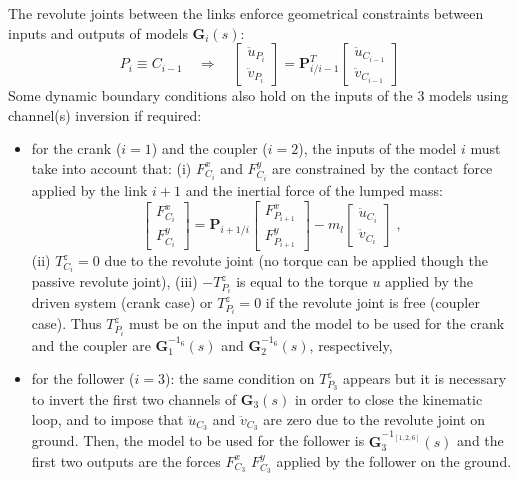 The revolute joints between the links enforce geometrical constraints between inputs and outputs of models $\mathbf{G}_i(s)$:
\[
P_{i}\equiv C_{i-1}\quad \Rightarrow \quad  \left[\begin{array}{c}\ddot{u}_{P_i} \\ \ddot{v}_{P_i}\end{array}\right]=\mathbf{P}_{i/i-1}^T\left[\begin{array}{c}\ddot{u}_{C_{i-1}} \\ \ddot{v}_{C_{i-1}}\end{array}\right]
\]
Some dynamic boundary conditions also hold on the inputs of the 3 models using channel(s) inversion if required:
\begin{itemize}
\item for the crank ($i=1$) and the coupler ($i=2$), the inputs of the model $i$ must take into account that: (i) $F^x_{C_i}$ and $F^y_{C_i}$ are constrained by the contact force applied by the link $i+1$ and the inertial force of the lumped mass:\begin{equation}
\left[\begin{array}{c}F^x_{C_{i}} \\ F^y_{C_{i}}\end{array}\right]=\mathbf{P}_{i+1/i}\left[\begin{array}{c} F^x_{P_{i+1}} \\ F^y_{P_{i+1}}\end{array}\right]-m_l\left[\begin{array}{c}\ddot{u}_{C_{i}} \\ \ddot{v}_{C_{i}}\end{array}\right]\;,
\end{equation} (ii) $T^z_{C_i}=0$ due to the revolute joint (no torque can be applied though the passive revolute joint),  (iii) $-T^z_{P_i}$ is equal to the torque $u$ applied by the driven system (crank case) or $T^z_{P_i}=0$ if the revolute joint is free (coupler case). Thus $T^z_{P_i}$ must be on the input and the model to be used for the crank and the coupler are $\mathbf{G}_1^{-1_6}(s)$ and $\mathbf{G}_2^{-1_6}(s)$, respectively,
\item for the follower ($i=3$): the same condition on $T^z_{P_3}$ appears but it is necessary to invert the first two channels of $\mathbf{G}_3(s)$ in order to close the kinematic loop, and to impose that $\ddot{u}_{C_3}$ and $\ddot{v}_{C_3}$ are zero due to the revolute joint on ground. Then, the model to be used for the follower is $\mathbf{G}_3^{-1_{[1,2,6]}}(s)$ and the first two outputs are the forces $F^x_{C_3}$ $F^y_{C_3}$ applied by the follower on the ground.
\end{itemize}
